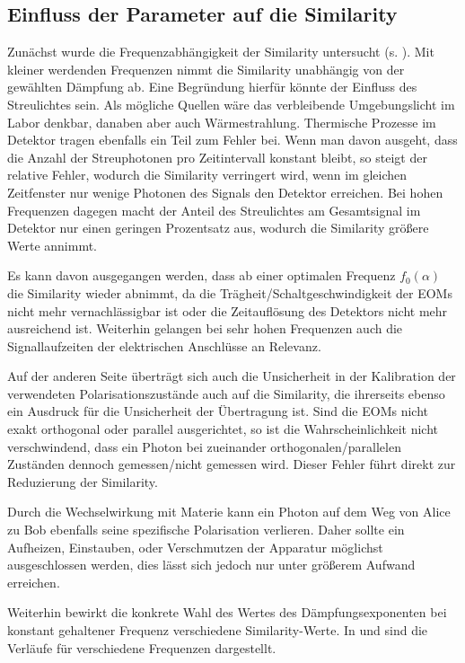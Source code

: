 \subsection{Einfluss der Parameter auf die Similarity}

Zunächst wurde die Frequenzabhängigkeit der Similarity untersucht (s.
). Mit kleiner werdenden Frequenzen nimmt die Similarity
unabhängig von der
gewählten Dämpfung ab. Eine Begründung hierfür könnte der Einfluss des
Streulichtes sein. Als mögliche Quellen wäre das verbleibende Umgebungslicht 
im Labor denkbar, danaben aber auch Wärmestrahlung. Thermische Prozesse im
Detektor tragen ebenfalls ein Teil zum Fehler bei.
Wenn man davon ausgeht, dass die Anzahl der Streuphotonen pro
Zeitintervall konstant bleibt, so steigt der relative Fehler, wodurch die
Similarity verringert wird, wenn im gleichen Zeitfenster nur wenige Photonen des
Signals den
Detektor erreichen. Bei hohen Frequenzen dagegen macht der Anteil des
Streulichtes am Gesamtsignal im Detektor nur einen geringen Prozentsatz aus,
wodurch die Similarity größere Werte annimmt.

Es kann davon ausgegangen werden, dass ab einer optimalen Frequenz $f_0(α)$ die
Similarity wieder abnimmt, da die Trägheit/Schaltgeschwindigkeit der EOMs nicht
mehr vernachlässigbar ist oder die Zeitauflösung des Detektors nicht mehr
ausreichend ist. Weiterhin gelangen bei sehr hohen Frequenzen auch die Signallaufzeiten
der elektrischen Anschlüsse an Relevanz.

Auf der anderen Seite überträgt sich auch die Unsicherheit in der Kalibration
der verwendeten Polarisationszustände auch auf die Similarity, die ihrerseits
ebenso ein Ausdruck für die Unsicherheit der Übertragung ist. Sind die
EOMs nicht exakt orthogonal oder parallel ausgerichtet, so ist die
Wahrscheinlichkeit nicht verschwindend, dass ein Photon bei zueinander
orthogonalen/parallelen Zuständen dennoch gemessen/nicht gemessen wird. Dieser
Fehler führt direkt zur Reduzierung der Similarity.

Durch die Wechselwirkung mit Materie kann ein Photon auf dem Weg von Alice zu
Bob ebenfalls seine spezifische Polarisation verlieren. Daher sollte ein Aufheizen,
Einstauben, oder Verschmutzen der Apparatur möglichst ausgeschlossen werden, dies
lässt sich jedoch nur unter größerem Aufwand erreichen.

Weiterhin bewirkt die konkrete Wahl des Wertes des Dämpfungsexponenten bei
konstant gehaltener Frequenz verschiedene Similarity-Werte. In 
und  sind die Verläufe für verschiedene Frequenzen dargestellt.

